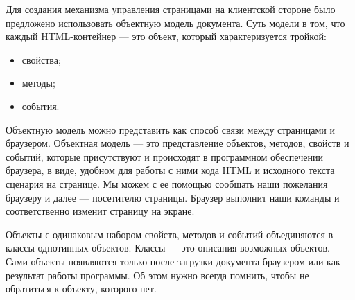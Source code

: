 Для создания механизма управления страницами на клиентской стороне было предложено использовать объектную модель документа. Суть модели в том, что каждый HTML-контейнер — это объект, который характеризуется тройкой:

\begin{itemize}
  \item свойства;
  \item методы;
  \item события.
\end{itemize}

Объектную модель можно представить как способ связи между страницами и браузером. Объектная модель — это представление объектов, методов, свойств и событий, которые присутствуют и происходят в программном обеспечении браузера, в виде, удобном для работы с ними кода HTML и исходного текста сценария на странице. Мы можем с ее помощью сообщать наши пожелания браузеру и далее — посетителю страницы. Браузер выполнит наши команды и соответственно изменит страницу на экране.

Объекты с одинаковым набором свойств, методов и событий объединяются в классы однотипных объектов. Классы — это описания возможных объектов. Сами объекты появляются только после загрузки документа браузером или как результат работы программы. Об этом нужно всегда помнить, чтобы не обратиться к объекту, которого нет.